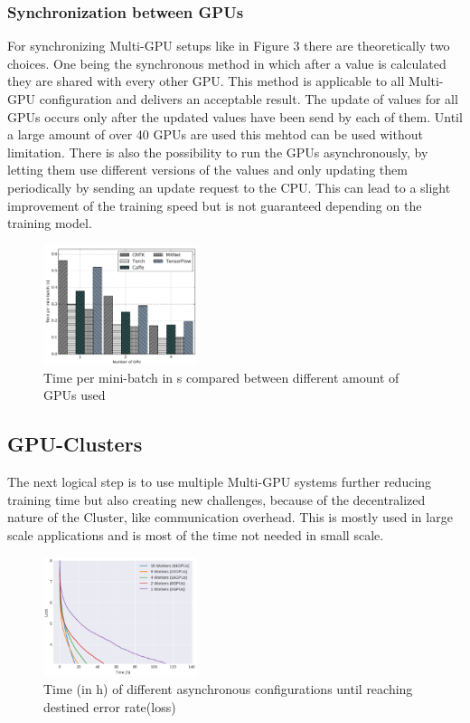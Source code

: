 \documentclass[conference]{IEEEtran}
\begin{document}
\subsubsection{Synchronization between GPUs}
For synchronizing Multi-GPU setups like in Figure 3 there are theoretically two choices. One being the synchronous method in which after a value is calculated they are shared with every other GPU. This method is applicable to all Multi-GPU configuration and delivers an acceptable result\cite{wang2016deep}. The update of values for all GPUs occurs only after the updated values have been send by each of them. Until a large amount of over 40 GPUs are used this mehtod can be used without limitation\cite{sastre2017scalability}. 
There is also the possibility to run the GPUs asynchronously, by letting them use different versions of the values and only updating them periodically by sending an update request to the CPU. This can lead to a slight improvement of the training speed but is not guaranteed depending on the training model\cite{wang2016deep}.


\begin{figure}
\centering
\includegraphics[width=0.4\textwidth]{a.png}

\caption{Time per mini-batch in s compared between different amount of GPUs used\cite{shi2016benchmarking}}
\label{fig_m_gpu}
\end{figure}

\subsection{GPU-Clusters}

The next logical step is to use multiple Multi-GPU systems further reducing training time but also creating new challenges, because of the decentralized nature of the Cluster, like communication overhead.  This is mostly used in large scale applications and is most of the time not needed in small scale.

\begin{figure}
\centering
\includegraphics[width=0.4\textwidth]{gpu_cluster_perf_win.png}
\caption{Time (in h) of different asynchronous configurations until reaching destined error rate(loss)\cite{sastre2017scalability}}
\label{fig_cl_gpus}
\end{figure}
\end{document}
